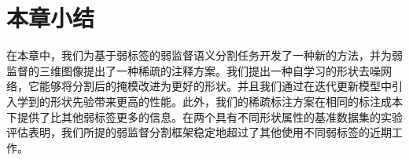 \section{本章小结}
在本章中，我们为基于弱标签的弱监督语义分割任务开发了一种新的方法，并为弱监督的三维图像提出了一种稀疏的注释方案。我们提出一种自学习的形状去噪网络，它能够将分割后的掩模改进为更好的形状。并且我们通过在迭代更新模型中引入学到的形状先验带来更高的性能。此外，我们的稀疏标注方案在相同的标注成本下提供了比其他弱标签更多的信息。在两个具有不同形状属性的基准数据集的实验评估表明，我们所提的弱监督分割框架稳定地超过了其他使用不同弱标签的近期工作。